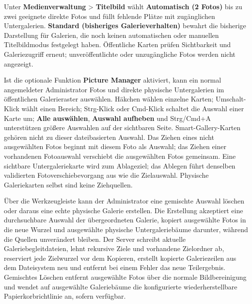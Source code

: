 \documentclass[11pt,a4paper]{article}
\newcommand{\ui}[1]{\textbf{#1}}
\begin{document}
Unter \ui{Medienverwaltung} > \ui{Titelbild} wählt \ui{Automatisch (2 Fotos)}
bis zu zwei geeignete direkte Fotos und füllt fehlende Plätze mit zugänglichen
Untergalerien. \ui{Standard (bisheriges Galerieverhalten)} bewahrt die bisherige
Darstellung für Galerien, die noch keinen automatischen oder manuellen
Titelbildmodus festgelegt haben. Öffentliche Karten prüfen Sichtbarkeit und
Galeriezugriff erneut; unveröffentlichte oder unzugängliche Fotos werden nicht
angezeigt.

Ist die optionale Funktion \ui{Picture Manager} aktiviert, kann ein normal
angemeldeter Administrator Fotos und direkte physische Untergalerien im
öffentlichen Galerieraster auswählen. Häkchen wählen einzelne Karten;
Umschalt-Klick wählt einen Bereich; Strg-Klick oder Cmd-Klick schaltet die
Auswahl einer Karte um; \ui{Alle auswählen}, \ui{Auswahl aufheben} und
Strg/Cmd+A unterstützen größere Auswahlen auf der sichtbaren Seite.
Smart-Gallery-Karten gehören nicht zu dieser dateibasierten Auswahl. Das Ziehen
eines nicht ausgewählten Fotos beginnt mit diesem Foto als Auswahl; das Ziehen
einer vorhandenen Fotoauswahl verschiebt die ausgewählten Fotos gemeinsam. Eine
sichtbare Untergaleriekarte wird zum Ablageziel; das Ablegen führt denselben
validierten Fotoverschiebevorgang aus wie die Zielauswahl. Physische
Galeriekarten selbst sind keine Ziehquellen.

Über die Werkzeugleiste kann der Administrator eine gemischte Auswahl löschen
oder daraus eine echte physische Galerie erstellen. Die Erstellung akzeptiert
eine durchsuchbare Auswahl der übergeordneten Galerie, kopiert ausgewählte Fotos
in die neue Wurzel und ausgewählte physische Untergaleriebäume darunter, während
die Quellen unverändert bleiben. Der Server schreibt aktuelle
Galeriebegleitdateien, lehnt rekursive Ziele und vorhandene Zielordner ab,
reserviert jede Zielwurzel vor dem Kopieren, erstellt kopierte Galeriezeilen aus
dem Dateisystem neu und entfernt bei einem Fehler das neue Teilergebnis.
Gemischtes Löschen entfernt ausgewählte Fotos über die normale Bildbereinigung
und wendet auf ausgewählte Galeriebäume die konfigurierte wiederherstellbare
Papierkorbrichtlinie an, sofern verfügbar.
\end{document}
